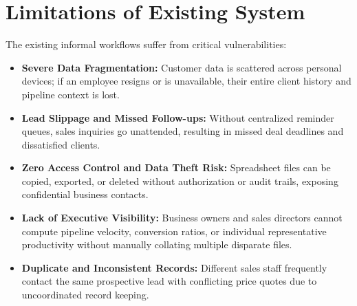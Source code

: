 \section{Limitations of Existing System}
The existing informal workflows suffer from critical vulnerabilities:
\begin{itemize}
    \item \textbf{Severe Data Fragmentation:} Customer data is scattered across personal devices; if an employee resigns or is unavailable, their entire client history and pipeline context is lost.
    \item \textbf{Lead Slippage and Missed Follow-ups:} Without centralized reminder queues, sales inquiries go unattended, resulting in missed deal deadlines and dissatisfied clients.
    \item \textbf{Zero Access Control and Data Theft Risk:} Spreadsheet files can be copied, exported, or deleted without authorization or audit trails, exposing confidential business contacts.
    \item \textbf{Lack of Executive Visibility:} Business owners and sales directors cannot compute pipeline velocity, conversion ratios, or individual representative productivity without manually collating multiple disparate files.
    \item \textbf{Duplicate and Inconsistent Records:} Different sales staff frequently contact the same prospective lead with conflicting price quotes due to uncoordinated record keeping.
\end{itemize}

